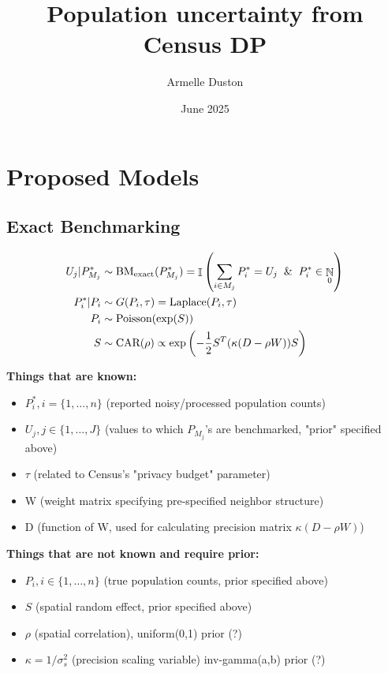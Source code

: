 \documentclass[12pt]{article}
\title{Population uncertainty from Census DP}
\author{Armelle Duston}
\date{June 2025}
\DeclareMathOperator{\N}{\mathbb{N}}
\DeclareMathOperator{\I}{\mathbb{I}}
\begin{document}
\maketitle

\section{Proposed Models}

\subsection{Exact Benchmarking}

\begin{align}
    U_j |P_{M_j}^* &\sim \text{BM}_{\text{exact}}(P_{M_j}^*)  = \I \left( \sum_{i \in M_j} P_i^* = U_j \And P_i^* \in \N_0 \right) \\
    P_i^* | P_i &\sim G(P_i, \tau) = \text{Laplace}( P_i, \tau)  \\
    P_i &\sim \text{Poisson}(\exp(S))\\
    S &\sim \text{CAR}(\rho) \propto \exp \left( - \frac{1}{2} S^T(\kappa (D- \rho W)) S \right)
\end{align}

\textbf{Things that are known:} 
\begin{itemize}
    \item $P_i^*, i = \{1, \dots, n\}$ (reported noisy/processed population counts)
    \item $U_j, j \in \{1, \dots, J\}$ (values to which $P_{M_j}$'s are benchmarked, "prior" specified above)
    \item $\tau$ (related to Census's "privacy budget" parameter)
    \item W (weight matrix specifying pre-specified neighbor structure)
    \item D (function of W, used for calculating precision matrix $\kappa (D- \rho W)$)
\end{itemize}

\textbf{Things that are not known and require prior:}
\begin{itemize}
    \item $P_i, i \in \{1, \dots, n\}$ (true population counts, prior specified above)
    \item $S$ (spatial random effect, prior specified above)
    \item $\rho$ (spatial correlation), uniform(0,1) prior (?)
    \item $\kappa = 1/\sigma^2_s$ (precision scaling variable) inv-gamma(a,b) prior (?)
\end{itemize}
\end{document}
